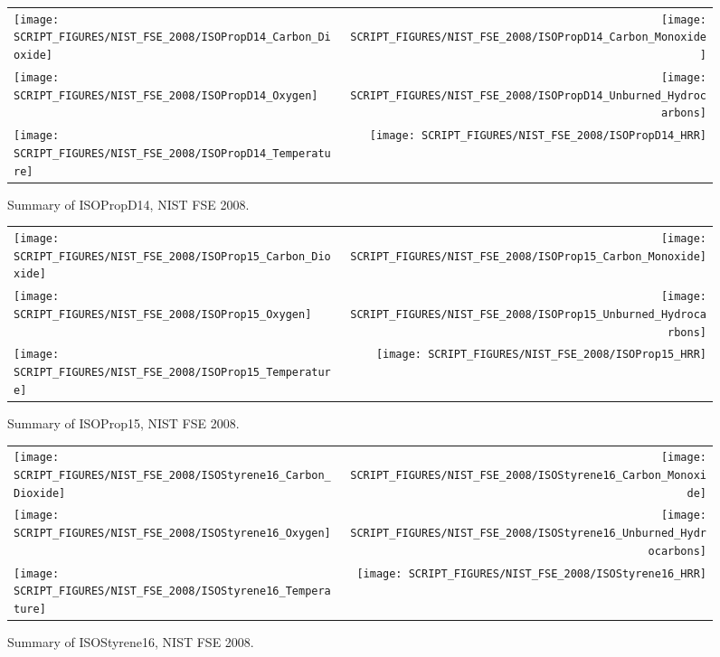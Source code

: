 \begin{figure}[p]
\begin{tabular*}{\textwidth}{l@{\extracolsep{\fill}}r}
\texttt{[image: SCRIPT\_FIGURES/NIST\_FSE\_2008/ISOPropD14\_Carbon\_Dioxide]} &
\texttt{[image: SCRIPT\_FIGURES/NIST\_FSE\_2008/ISOPropD14\_Carbon\_Monoxide]} \\
\texttt{[image: SCRIPT\_FIGURES/NIST\_FSE\_2008/ISOPropD14\_Oxygen]} &
\texttt{[image: SCRIPT\_FIGURES/NIST\_FSE\_2008/ISOPropD14\_Unburned\_Hydrocarbons]} \\
\texttt{[image: SCRIPT\_FIGURES/NIST\_FSE\_2008/ISOPropD14\_Temperature]} &
\texttt{[image: SCRIPT\_FIGURES/NIST\_FSE\_2008/ISOPropD14\_HRR]}
\end{tabular*}
\caption[Summary of ISOPropD14, NIST FSE 2008]{Summary of ISOPropD14, NIST FSE 2008.}
\label{NIST_FSE_1994_ISOPropD14}
\end{figure}

\begin{figure}[p]
\begin{tabular*}{\textwidth}{l@{\extracolsep{\fill}}r}
\texttt{[image: SCRIPT\_FIGURES/NIST\_FSE\_2008/ISOProp15\_Carbon\_Dioxide]} &
\texttt{[image: SCRIPT\_FIGURES/NIST\_FSE\_2008/ISOProp15\_Carbon\_Monoxide]} \\
\texttt{[image: SCRIPT\_FIGURES/NIST\_FSE\_2008/ISOProp15\_Oxygen]} &
\texttt{[image: SCRIPT\_FIGURES/NIST\_FSE\_2008/ISOProp15\_Unburned\_Hydrocarbons]} \\
\texttt{[image: SCRIPT\_FIGURES/NIST\_FSE\_2008/ISOProp15\_Temperature]} &
\texttt{[image: SCRIPT\_FIGURES/NIST\_FSE\_2008/ISOProp15\_HRR]}
\end{tabular*}
\caption[Summary of ISOProp15, NIST FSE 2008]{Summary of ISOProp15, NIST FSE 2008.}
\label{NIST_FSE_1994_ISOProp15}
\end{figure}

\begin{figure}[p]
\begin{tabular*}{\textwidth}{l@{\extracolsep{\fill}}r}
\texttt{[image: SCRIPT\_FIGURES/NIST\_FSE\_2008/ISOStyrene16\_Carbon\_Dioxide]} &
\texttt{[image: SCRIPT\_FIGURES/NIST\_FSE\_2008/ISOStyrene16\_Carbon\_Monoxide]} \\
\texttt{[image: SCRIPT\_FIGURES/NIST\_FSE\_2008/ISOStyrene16\_Oxygen]} &
\texttt{[image: SCRIPT\_FIGURES/NIST\_FSE\_2008/ISOStyrene16\_Unburned\_Hydrocarbons]} \\
\texttt{[image: SCRIPT\_FIGURES/NIST\_FSE\_2008/ISOStyrene16\_Temperature]} &
\texttt{[image: SCRIPT\_FIGURES/NIST\_FSE\_2008/ISOStyrene16\_HRR]}
\end{tabular*}
\caption[Summary of ISOStyrene16, NIST FSE 2008]{Summary of ISOStyrene16, NIST FSE 2008.}
\label{NIST_FSE_1994_ISOStyrene16}
\end{figure}

